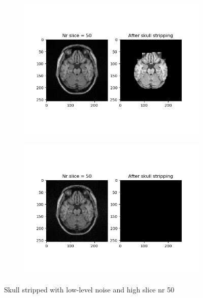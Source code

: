 \begin{figure}[H]
	\centering
	\begin{subfigure}[b]{0.35\linewidth}
		\includegraphics[scale=0.35]{figures/Module_08/M8_6.png}
	\end{subfigure}
		\begin{subfigure}[b]{0.35\linewidth}
		\includegraphics[scale=0.35]{figures/Module_08/M8_n6.png}
	\end{subfigure}
	\caption{Skull stripped with low-level noise and high slice nr 50}
	\label{fig:figures/m08_6}
\end{figure}

